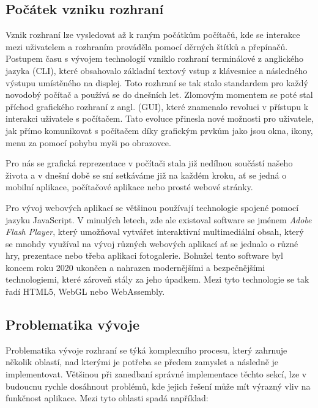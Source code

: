 \subsection{Počátek vzniku rozhraní}
\label{subsec:ui-gui-theory-beginning}
Vznik rozhraní lze vysledovat až k raným počátkům počítačů, kde se interakce mezi uživatelem a rozhraním prováděla pomocí děrných štítků a přepínačů. Postupem času s vývojem technologií vzniklo rozhraní terminálové z anglického jazyka \textit{} (CLI), které obsahovalo základní textový vstup z klávesnice a následného výstupu umístěného na displej. Toto rozhraní se tak stalo standardem pro každý novodobý počítač a používá se do dnešních let. Zlomovým momentem se poté stal příchod grafického rozhraní z angl. \textit{} (GUI), které znamenalo revoluci v přístupu k interakci uživatele s počítačem. Tato evoluce přinesla nové možnosti pro uživatele, jak přímo komunikovat s počítačem díky grafickým prvkům jako jsou okna, ikony, menu za pomocí pohybu myši po obrazovce.

Pro nás se grafická reprezentace v počítači stala již nedílnou součástí našeho života a v dnešní době se sní setkáváme již na každém kroku, ať se jedná o mobilní aplikace, počítačové aplikace nebo prosté webové stránky.

Pro vývoj webových aplikací se většinou používají technologie spojené pomocí jazyku JavaScript. V minulých letech, zde ale existoval software se jménem \textit{Adobe Flash Player}, který umožňoval vytvářet interaktivní multimediální obsah, který se mnohdy využíval na vývoj různých webových aplikací ať se jednalo o různé hry, prezentace nebo třeba aplikaci fotogalerie. Bohužel tento software byl koncem roku 2020 ukončen a nahrazen modernějšími a bezpečnějšími technologiemi, které zároveň stály za jeho úpadkem. Mezi tyto technologie se tak řadí HTML5, WebGL nebo WebAssembly. \cite{adobeFlashPlayer-eol}

\subsection{Problematika vývoje}
\label{subsec:ui-gui-theory-problems}
Problematika vývoje rozhraní se týká komplexního procesu, který zahrnuje několik oblastí, nad kterými je potřeba se předem zamyslet a následně je implementovat. Většinou při zanedbaní správné implementace těchto sekcí, lze v budoucnu rychle dosáhnout problémů, kde jejich řešení může mít výrazný vliv na funkčnost aplikace. Mezi tyto oblasti spadá například:

